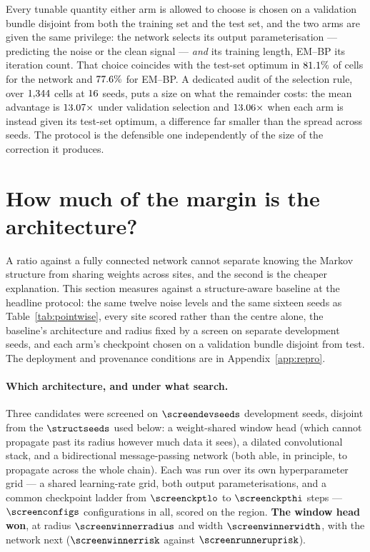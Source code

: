 Every tunable quantity either arm is allowed to choose is chosen on a
validation bundle disjoint from both the training set and the test set, and the
two arms are given the same privilege: the network selects its output
parameterisation --- predicting the noise or the clean signal --- \emph{and} its
training length, EM--BP its iteration count. That choice coincides with the
test-set optimum in $81.1\%$ of cells for the network and $77.6\%$ for
EM--BP. A dedicated audit of the selection rule, over $1{,}344$ cells at
$16$ seeds, puts a size on what the remainder costs: the mean advantage
is $13.07\times$ under validation selection and
$13.06\times$ when each arm is instead given its test-set optimum, a
difference far smaller than the spread across seeds. The protocol is the
defensible one independently of the size of the correction it produces.

\section{How much of the margin is the architecture?}\label{sec:em-architecture}

A ratio against a fully connected network cannot separate knowing the Markov
structure from sharing weights across sites, and the second is the cheaper
explanation. This section measures against a structure-aware baseline at the
headline protocol: the same twelve noise levels and the same sixteen seeds as
Table~\ref{tab:pointwise}, every site scored rather than the centre alone, the
baseline's architecture and radius fixed by a screen on separate development
seeds, and each arm's checkpoint chosen on a validation bundle disjoint from
test. The deployment and provenance conditions are in
Appendix~\ref{app:repro}.

\paragraph{Which architecture, and under what search.} Three candidates were
screened on $\screendevseeds$ development seeds, disjoint from the
$\structseeds$ used below: a weight-shared window head (which cannot propagate
past its radius however much data it sees), a dilated convolutional stack, and a
bidirectional message-passing network (both able, in principle, to propagate
across the whole chain). Each was run over its own hyperparameter grid --- a
shared learning-rate grid, both output parameterisations, and a common
checkpoint ladder from $\screenckptlo$ to $\screenckpthi$ steps ---
$\screenconfigs$ configurations in all, scored on the \screenregion{} region.
\textbf{The window head won}, at radius $\screenwinnerradius$ and width
$\screenwinnerwidth$, with the \screenrunnerup{} network next
($\screenwinnerrisk$ against $\screenrunneruprisk$).

